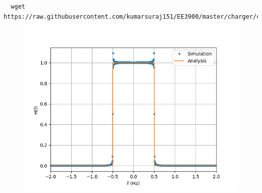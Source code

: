 \documentclass[journal,12pt,twocolumn]{IEEEtran}
\renewcommand\thesection{\arabic{section}}
\begin{document}
\begin{enumerate}[label=\thesection.\arabic*
,ref=\thesection.\theenumi]
\begin{lstlisting}
  wget https://raw.githubusercontent.com/kumarsuraj151/EE3900/master/charger/codes/3.10.py
\end{lstlisting}
\begin{figure}[!ht]
  \centering
  \includegraphics[width=\columnwidth]{./figs/3.10}
  \caption{}
\end{figure}
\end{enumerate}
\end{document}
